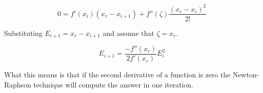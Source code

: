 \begin{enumerate}
\begin{equation}
0 = f'(x_i)(x_r-x_{i+1}) + f''(\zeta)\frac{(x_r-x_i)^2}{2!}
\end{equation}

Substituting $E_{i+1} = x_r-x_{i+1}$ and assume that $\zeta=x_r$.

\begin{equation}
E_{i+1} = \frac{-f''(x_r)}{2f'(x_r)}E_i^2
\end{equation}

What this means is that if the second derivative of a function is zero
the Newton-Raphson technique will compute the answer in one iteration.

\end{enumerate}


